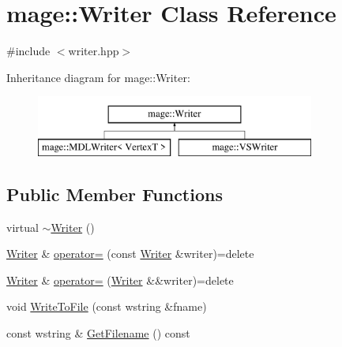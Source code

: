 \hypertarget{classmage_1_1_writer}{}\section{mage\+:\+:Writer Class Reference}
\label{classmage_1_1_writer}


{\ttfamily \#include $<$writer.\+hpp$>$}

Inheritance diagram for mage\+:\+:Writer\+:\begin{figure}[H]
\begin{center}
\leavevmode
\includegraphics[height=2.000000cm]{classmage_1_1_writer}
\end{center}
\end{figure}
\subsection*{Public Member Functions}
\begin{DoxyCompactItemize}
\item 
virtual \hyperlink{classmage_1_1_writer_aeeb30d6afb1a271b4ad294889054caec}{$\sim$\+Writer} ()
\item 
\hyperlink{classmage_1_1_writer}{Writer} \& \hyperlink{classmage_1_1_writer_a81ea888d1b170515713432ca28629ceb}{operator=} (const \hyperlink{classmage_1_1_writer}{Writer} \&writer)=delete
\item 
\hyperlink{classmage_1_1_writer}{Writer} \& \hyperlink{classmage_1_1_writer_aefbdd9a659983b543358cc8277ab890c}{operator=} (\hyperlink{classmage_1_1_writer}{Writer} \&\&writer)=delete
\item 
void \hyperlink{classmage_1_1_writer_aa65ca7f473b3c95e94c72e25efc4c4c8}{Write\+To\+File} (const wstring \&fname)
\item 
const wstring \& \hyperlink{classmage_1_1_writer_aa874f2ee6cdd6663078d213f10d984f1}{Get\+Filename} () const
\end{DoxyCompactItemize}
